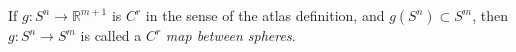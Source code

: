 If $g: S^n \to \mathbb{R}^{m+1}$ is $C^r$ in the sense of the atlas definition, and $g(S^n) \subset S^m$, then $g: S^n \to S^m$ is called a $C^r$ \textit{map between spheres}.
